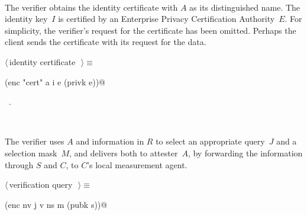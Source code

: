 \documentclass[titlepage,12pt]{article}
\theoremstyle{definition}
\begin{document}
\begin{description}
\begin{flushleft}
\begin{minipage}{\linewidth}
\begin{list}{}{\setlength{\itemsep}{-\parsep}\setlength{\itemindent}{-\leftmargin}}
\end{list}
\end{minipage}\\[4ex]
\end{flushleft}
\item[$E\to V:\ptova\colon$]
The verifier obtains the identity certificate with $A$ as its
distinguished name.  The identity key~$I$ is certified by an
Enterprise Privacy Certification Authority~$E$.  For simplicity, the
verifier's request for the certificate has been omitted.  Perhaps the
client sends the certificate with its request for the data.
\begin{flushleft} \small
\begin{minipage}{\linewidth} \label{scrap3}
$\langle\,$identity certificate\nobreak\ {\footnotesize {}}$\,\rangle\equiv$
\vspace{-1ex}
\begin{list}{}{} \item
\mbox{}\verb@(enc "cert" a i e (privk e))@{\NWsep}
\end{list}
\vspace{-1ex}
\footnotesize\addtolength{\baselineskip}{-1ex}
\begin{list}{}{\setlength{\itemsep}{-\parsep}\setlength{\itemindent}{-\leftmargin}}
\item \NWtxtMacroRefIn\ .
\end{list}
\end{minipage}\\[4ex]
\end{flushleft}
\item[$V\to S:\vtosa\colon$]
The verifier uses $A$ and information in $R$ to select an appropriate
query~$J$ and a selection mask~$M$, and delivers both to attester~$A$,
by forwarding the information through $S$ and $C$, to $C$'s local
measurement agent.
\begin{flushleft} \small
\begin{minipage}{\linewidth} \label{scrap4}
$\langle\,$verification query\nobreak\ {\footnotesize {}}$\,\rangle\equiv$
\vspace{-1ex}
\begin{list}{}{} \item
\mbox{}\verb@(enc nv j v ns m (pubk s))@{\NWsep}
\end{list}
\vspace{-1ex}
\footnotesize\addtolength{\baselineskip}{-1ex}
\begin{list}{}{\setlength{\itemsep}{-\parsep}\setlength{\itemindent}{-\leftmargin}}

\end{list}
\end{minipage}
\end{flushleft}
\end{description}
\end{document}
